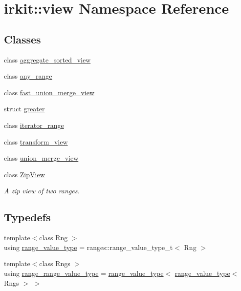 \hypertarget{namespaceirkit_1_1view}{}\section{irkit\+:\+:view Namespace Reference}
\label{namespaceirkit_1_1view}
\subsection*{Classes}
\begin{DoxyCompactItemize}
\item 
class \hyperlink{classirkit_1_1view_1_1aggregate__sorted__view}{aggregate\+\_\+sorted\+\_\+view}
\item 
class \hyperlink{classirkit_1_1view_1_1any__range}{any\+\_\+range}
\item 
class \hyperlink{classirkit_1_1view_1_1fast__union__merge__view}{fast\+\_\+union\+\_\+merge\+\_\+view}
\item 
struct \hyperlink{structirkit_1_1view_1_1greater}{greater}
\item 
class \hyperlink{classirkit_1_1view_1_1iterator__range}{iterator\+\_\+range}
\item 
class \hyperlink{classirkit_1_1view_1_1transform__view}{transform\+\_\+view}
\item 
class \hyperlink{classirkit_1_1view_1_1union__merge__view}{union\+\_\+merge\+\_\+view}
\item 
class \hyperlink{classirkit_1_1view_1_1ZipView}{Zip\+View}
\begin{DoxyCompactList}\small\item\em A zip view of two ranges. \end{DoxyCompactList}\end{DoxyCompactItemize}
\subsection*{Typedefs}
\begin{DoxyCompactItemize}
\item 
{\footnotesize template$<$class Rng $>$ }\\using \hyperlink{namespaceirkit_1_1view_aa01f8ad24d5b6600bc31631b56448817}{range\+\_\+value\+\_\+type} = ranges\+::range\+\_\+value\+\_\+type\+\_\+t$<$ Rng $>$
\item 
{\footnotesize template$<$class Rngs $>$ }\\using \hyperlink{namespaceirkit_1_1view_ae24f427c615bdecfcded89b8f028fb6c}{range\+\_\+range\+\_\+value\+\_\+type} = \hyperlink{namespaceirkit_1_1view_aa01f8ad24d5b6600bc31631b56448817}{range\+\_\+value\+\_\+type}$<$ \hyperlink{namespaceirkit_1_1view_aa01f8ad24d5b6600bc31631b56448817}{range\+\_\+value\+\_\+type}$<$ Rngs $>$ $>$
\end{DoxyCompactItemize}
